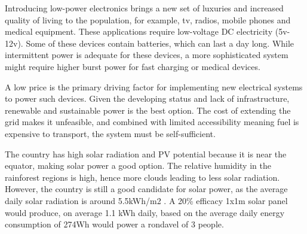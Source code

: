 












Introducing low-power electronics brings a new set of luxuries and increased quality of living to the population, for example, tv, radios, mobile phones and medical equipment. These applications require low-voltage DC electricity (5v-12v). Some of these devices contain batteries, which can last a day long. While intermittent power is adequate for these devices, a more sophisticated system might require higher burst power for fast charging or medical devices.


A low price is the primary driving factor for implementing new electrical systems to power such devices. Given the developing status and lack of infrastructure, renewable and sustainable power is the best option. The cost of extending the grid makes it unfeasible, and combined with limited accessibility meaning fuel is expensive to transport, the system must be self-sufficient.

The country has high solar radiation and PV potential because it is near the equator, making solar power a good option. The relative humidity in the rainforest regions is high, hence more clouds leading to less solar radiation. However, the country is still a good candidate for solar power, as the average daily solar radiation is around 5.5kWh/m2 \cite{Aly2017Dec}. A 20\% efficacy 1x1m solar panel would produce, on average 1.1 kWh daily, based on the average daily energy consumption of 274Wh would power a rondavel of 3 people. 

